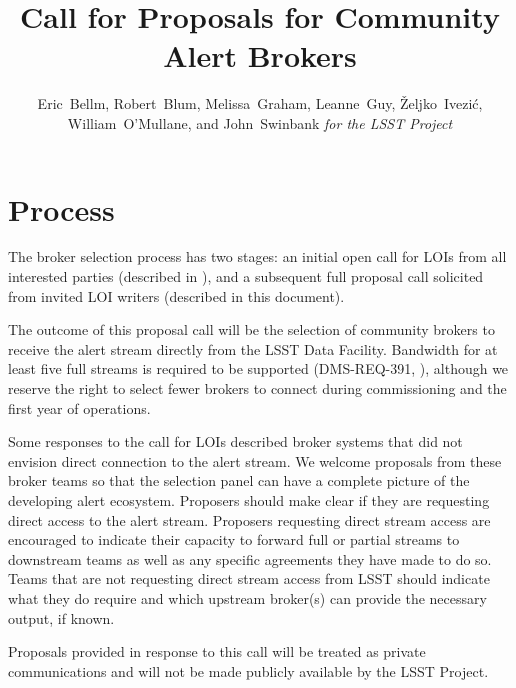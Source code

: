 \documentclass[DM,toc]{lsstdoc}
\title{Call for Proposals for Community Alert Brokers}
\author{
Eric~Bellm,
Robert~Blum,
Melissa~Graham,
Leanne~Guy,
\v{Z}eljko~Ivezi\'{c},
William~O'Mullane,
and John~Swinbank
\emph{for the LSST Project}
}
\begin{document}

\maketitle

\section{Process}

The broker selection process has two stages:
an initial open call for LOIs from all interested parties (described in ), and a subsequent full proposal call solicited from invited LOI writers (described in this document).

The outcome of this proposal call will be the selection of community brokers to receive the alert stream directly from the LSST Data Facility.
Bandwidth for at least five full streams is required to be supported (DMS-REQ-391, ), although we reserve the right to select fewer brokers to connect during commissioning and the first year of operations.

Some responses to the call for LOIs described broker systems that did not envision direct connection to the alert stream.
We welcome proposals from these broker teams so that the selection panel can have a complete picture of the developing alert ecosystem.
Proposers should make clear if they are requesting direct access to the alert stream.
Proposers requesting direct stream access are encouraged to indicate their capacity to forward full or partial streams to downstream teams as well as any specific agreements they have made to do so. 
Teams that are not requesting direct stream access from LSST should indicate what they do require and which upstream broker(s) can provide the necessary output, if known.

Proposals provided in response to this call will be treated as private communications and will not be made publicly available by the LSST Project.
\end{document}
